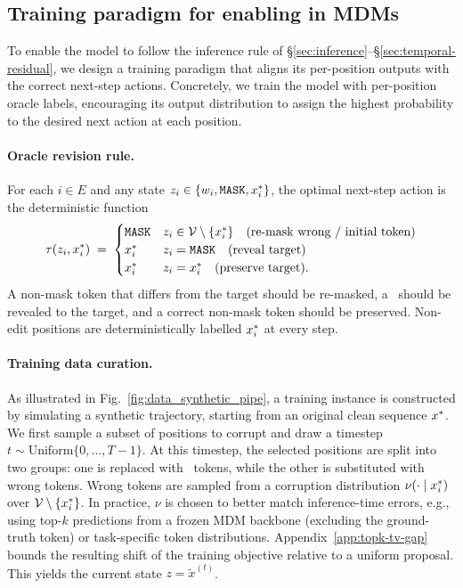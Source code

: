 \subsection{Training paradigm for enabling \methodfull in MDMs}
\label{sec:training}

To enable the model to follow the inference rule of \S\ref{sec:inference}--\S\ref{sec:temporal-residual}, we design a training paradigm that aligns its per-position outputs with the correct next-step actions. Concretely, we train the model with per-position oracle labels, encouraging its output distribution to assign the highest probability to the desired next action at each position.

\paragraph{Oracle revision rule.}
For each $i \in E$ and any state $z_i \in \{w_i, \texttt{MASK}, x^{\ast}_i\}$, the optimal next-step action is the deterministic function
\begin{equation}
\tau(z_i, x^{\ast}_i) \;=\; \begin{cases}
\texttt{MASK} & z_i \in \mathcal{V} \setminus \{x^{\ast}_i\} \quad \text{(re-mask wrong / initial token)} \\
x^{\ast}_i & z_i = \texttt{MASK} \quad \text{(reveal target)} \\
x^{\ast}_i & z_i = x^{\ast}_i \quad \text{(preserve target).}
\end{cases}
\label{eq:oracle-tau-method}
\end{equation}
A non-mask token that differs from the target should be re-masked, a \mask\ should be revealed to the target, and a correct non-mask token should be preserved. Non-edit positions are deterministically labelled $x^{\ast}_i$ at every step.

\paragraph{Training data curation.}

As illustrated in Fig.~\ref{fig:data_synthetic_pipe}, a training instance is constructed by simulating a synthetic trajectory, starting from an original clean sequence $x^{\ast}$. We first sample a subset of positions to corrupt and draw a timestep $t \sim \mathrm{Uniform}\{0, \ldots, T-1\}$. At this timestep, the selected positions are split into two groups: one is replaced with \mask\ tokens, while the other is substituted with wrong tokens. Wrong tokens are sampled from a corruption distribution $\nu(\cdot \mid x^{\ast}_i)$ over $\mathcal{V} \setminus \{x^{\ast}_i\}$. In practice, $\nu$ is chosen to better match inference-time errors, e.g., using top-$k$ predictions from a frozen MDM backbone (excluding the ground-truth token) or task-specific token distributions. Appendix~\ref{app:topk-tv-gap} bounds the resulting shift of the training objective relative to a uniform proposal. This yields the current state $z = \tilde{x}^{(t)}$.

